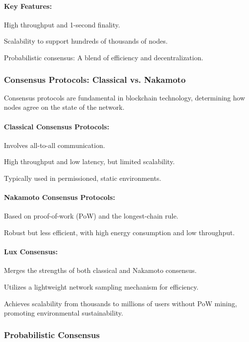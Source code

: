 \documentclass[11pt]{article}
\begin{document}
\paragraph{Key Features:}

High throughput and 1-second finality.


Scalability to support hundreds of thousands of nodes.


Probabilistic consensus: A blend of efficiency and decentralization.


\subsubsection{Consensus Protocols: Classical vs. Nakamoto}

Consensus protocols are fundamental in blockchain technology, determining how nodes agree on the state of the network.


\paragraph{Classical Consensus Protocols:}

Involves all-to-all communication.


High throughput and low latency, but limited scalability.


Typically used in permissioned, static environments.


\paragraph{Nakamoto Consensus Protocols:}

Based on proof-of-work (PoW) and the longest-chain rule.


Robust but less efficient, with high energy consumption and low throughput.


\paragraph{Lux Consensus:}

Merges the strengths of both classical and Nakamoto consensus.


Utilizes a lightweight network sampling mechanism for efficiency.


Achieves scalability from thousands to millions of users without PoW mining, promoting environmental sustainability.


\subsubsection{Probabilistic Consensus}
\end{document}
